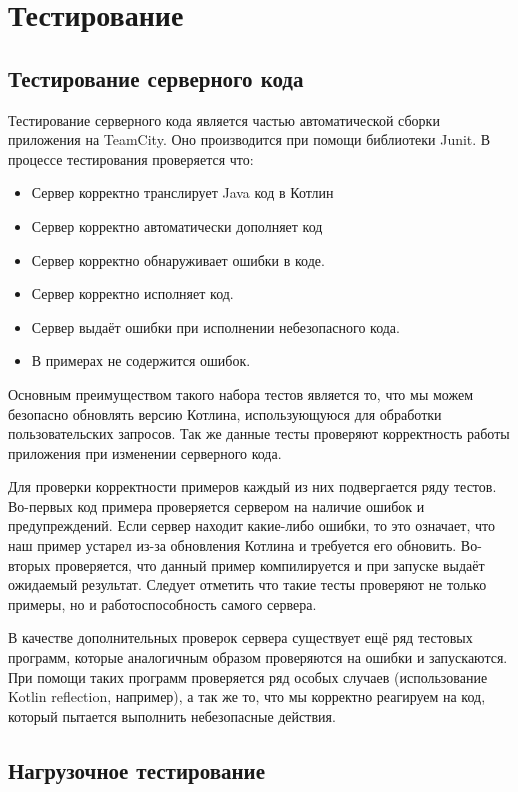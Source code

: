 \chapter{Тестирование}
\section{Тестирование серверного кода}
	Тестирование серверного кода является частью автоматической сборки приложения на TeamCity. Оно производится при помощи библиотеки Junit. В процессе тестирования проверяется что:
\begin{itemize}
\item Сервер корректно транслирует Java код в Котлин
\item Сервер корректно автоматически дополняет код
\item Сервер корректно обнаруживает ошибки в коде.
\item Сервер корректно исполняет код.
\item Сервер выдаёт ошибки при исполнении небезопасного кода.
\item В примерах не содержится ошибок. 
\end{itemize}
	
	Основным преимуществом такого набора тестов является то, что мы можем безопасно обновлять версию Котлина, использующуюся для обработки пользовательских запросов. Так же данные тесты проверяют корректность работы приложения при изменении серверного кода.
	
	Для проверки корректности примеров каждый из них подвергается ряду тестов. Во-первых код примера проверяется сервером на наличие ошибок и предупреждений. Если сервер находит какие-либо ошибки, то это означает, что наш пример устарел из-за обновления Котлина и требуется его обновить. Во-вторых проверяется, что данный пример компилируется и при запуске выдаёт ожидаемый результат. Следует отметить что такие тесты проверяют не только примеры, но и работоспособность самого сервера. 
	
	В качестве дополнительных проверок сервера существует ещё ряд тестовых программ, которые  аналогичным образом проверяются на ошибки и запускаются. При помощи таких программ проверяется ряд особых случаев (использование Kotlin reflection, например), а так же то, что мы корректно реагируем на код, который пытается выполнить небезопасные действия.
	
\section{Нагрузочное тестирование}

